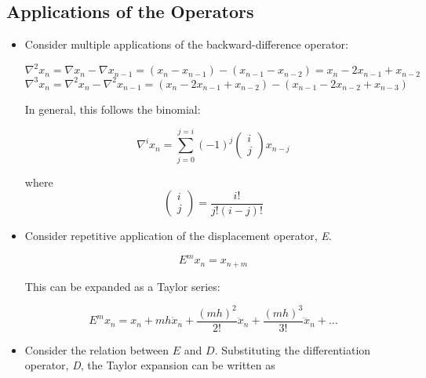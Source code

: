 \subsection{Applications of the Operators}
\begin{itemize}


\item Consider multiple applications of the backward-difference operator:

\begin{equation*}
\nabla^{2}x_{n} = \nabla x_{n}-\nabla x_{n-1} = 
(x_{n}-x_{n-1})-(x_{n-1}-x_{n-2}) = x_{n}-2x_{n-1}+x_{n-2}
\end{equation*}
\begin{equation*}
\nabla ^{3}x_{n} =  \nabla ^{2}x_{n}-\nabla ^{2}x_{n-1}  =
(x_{n}-2x_{n-1}+x_{n-2})-(x_{n-1}-2x_{n-2}+x_{n-3})
\end{equation*}

In general, this follows the binomial:


\begin{equation} \label{eq:del_binomial}
 \nabla ^{i}x_{n}=\sum
_{j=0}^{j=i}(-1)^{j}\left(\begin{matrix}i\\j\end{matrix}\right)x_{n-j}
\end{equation}

where  
\begin{equation*}
 \left(\begin{matrix}i\\j\end{matrix}\right)=\frac{i!}{j!(i-j)!}
\end{equation*}


\item Consider repetitive application of the displacement operator,
\textit{E}.

\begin{equation*}
E^{m}x_{n}=x_{n+m}
\end{equation*}

This can be expanded as a Taylor series:

\begin{equation*}
E^{m}x_{n}=x_{n}+\mathit{mh}\dot{x}_{n}+
\frac{(\mathit{mh})^{2}}{2!}\ddot{x}_{n}+
\frac{(\mathit{mh})^{3}}{3!}\dddot{x}_{n}+...
\end{equation*}

\item Consider the relation between $E$ and $D$.
Substituting the differentiation operator, \textit{D}, the Taylor
expansion can be written as 


\end{itemize}
